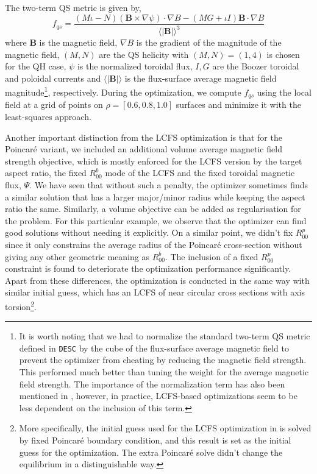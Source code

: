 \documentclass{jpp}
\begin{document}
The two-term QS metric is given by,
\begin{equation}
f_{qs}= \frac{(M\iota - N)(\bm{B}\times\nabla\psi)\cdot\nabla B - (MG+\iota I)\bm{B}\cdot\nabla B}{\langle|\bm{B}|\rangle^3}
\label{f_qs}
\end{equation}
where $\bm{B}$ is the magnetic field, $\nabla B$ is the gradient of the magnitude of the magnetic field, $(M,N)$ are the QS helicity with $(M,N)=(1,4)$ is chosen for the QH case, $\psi$ is the normalized toroidal flux, $I,G$ are the Boozer toroidal and poloidal currents and $\langle|\bm{B}|\rangle$ is the flux-surface average magnetic field magnitude\footnote{It is worth noting that we had to normalize the standard two-term QS metric defined in \texttt{DESC} by the cube of the flux-surface average magnetic field to prevent the optimizer from cheating by reducing the magnetic field strength. This performed much better than tuning the weight for the average magnetic field strength. The importance of the normalization term has also been mentioned in \cite{landremanMagneticFieldsPrecise2022}, however, in practice, LCFS-based optimizations seem to be less dependent on the inclusion of this term.}, respectively. During the optimization, we compute $f_{qs}$ using the local field at a grid of points on $\rho=[0.6, 0.8, 1.0]$ surfaces and minimize it with the least-squares approach.

Another important distinction from the LCFS optimization is that for the Poincaré variant, we included an additional volume average magnetic field strength objective, which is mostly enforced for the LCFS version by the target aspect ratio, the fixed $R^b_{00}$ mode of the LCFS and the fixed toroidal magnetic flux, $\Psi$. We have seen that without such a penalty, the optimizer sometimes finds a similar solution that has a larger major/minor radius while keeping the aspect ratio the same. Similarly, a volume objective can be added as regularisation for the problem. For this particular example, we observe that the optimizer can find good solutions without needing it explicitly. On a similar point, we didn't fix $R^p_{00}$ since it only constrains the average radius of the Poincaré cross-section without giving any other geometric meaning as $R^b_{00}$. The inclusion of a fixed $R^p_{00}$ constraint is found to deteriorate the optimization performance significantly. Apart from these differences, the optimization is conducted in the same way with similar initial guess, which has an LCFS of near circular cross sections with axis torsion\footnote{More specifically, the initial guess used for the LCFS optimization in \cite{landremanMagneticFieldsPrecise2022} is solved by fixed Poincaré boundary condition, and this result is set as the initial guess for the optimization. The extra Poincaré solve didn't change the equilibrium in a distinguishable way.}.
\end{document}
